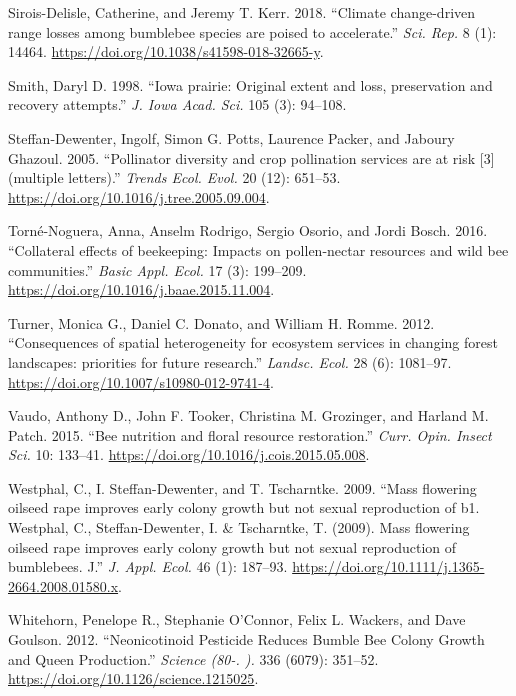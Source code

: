 \documentclass[11pt,]{article}
\begin{document}
\leavevmode\hypertarget{ref-Sirois-Delisle2018}{}%
Sirois-Delisle, Catherine, and Jeremy T. Kerr. 2018. ``Climate
change-driven range losses among bumblebee species are poised to
accelerate.'' \emph{Sci. Rep.} 8 (1): 14464.
\url{https://doi.org/10.1038/s41598-018-32665-y}.

\leavevmode\hypertarget{ref-Smith1998}{}%
Smith, Daryl D. 1998. ``Iowa prairie: Original extent and loss,
preservation and recovery attempts.'' \emph{J. Iowa Acad. Sci.} 105 (3):
94--108.

\leavevmode\hypertarget{ref-Steffan-Dewenter2005c}{}%
Steffan-Dewenter, Ingolf, Simon G. Potts, Laurence Packer, and Jaboury
Ghazoul. 2005. ``Pollinator diversity and crop pollination services are
at risk {[}3{]} (multiple letters).'' \emph{Trends Ecol. Evol.} 20 (12):
651--53. \url{https://doi.org/10.1016/j.tree.2005.09.004}.

\leavevmode\hypertarget{ref-Torne-Noguera2016}{}%
Torné-Noguera, Anna, Anselm Rodrigo, Sergio Osorio, and Jordi Bosch.
2016. ``Collateral effects of beekeeping: Impacts on pollen-nectar
resources and wild bee communities.'' \emph{Basic Appl. Ecol.} 17 (3):
199--209. \url{https://doi.org/10.1016/j.baae.2015.11.004}.

\leavevmode\hypertarget{ref-Turner2012}{}%
Turner, Monica G., Daniel C. Donato, and William H. Romme. 2012.
``Consequences of spatial heterogeneity for ecosystem services in
changing forest landscapes: priorities for future research.''
\emph{Landsc. Ecol.} 28 (6): 1081--97.
\url{https://doi.org/10.1007/s10980-012-9741-4}.

\leavevmode\hypertarget{ref-Vaudo2015}{}%
Vaudo, Anthony D., John F. Tooker, Christina M. Grozinger, and Harland
M. Patch. 2015. ``Bee nutrition and floral resource restoration.''
\emph{Curr. Opin. Insect Sci.} 10: 133--41.
\url{https://doi.org/10.1016/j.cois.2015.05.008}.

\leavevmode\hypertarget{ref-Westphal2009a}{}%
Westphal, C., I. Steffan-Dewenter, and T. Tscharntke. 2009. ``Mass
flowering oilseed rape improves early colony growth but not sexual
reproduction of b1. Westphal, C., Steffan-Dewenter, I. \& Tscharntke, T.
(2009). Mass flowering oilseed rape improves early colony growth but not
sexual reproduction of bumblebees. J.'' \emph{J. Appl. Ecol.} 46 (1):
187--93. \url{https://doi.org/10.1111/j.1365-2664.2008.01580.x}.

\leavevmode\hypertarget{ref-Whitehorn2012}{}%
Whitehorn, Penelope R., Stephanie O'Connor, Felix L. Wackers, and Dave
Goulson. 2012. ``Neonicotinoid Pesticide Reduces Bumble Bee Colony
Growth and Queen Production.'' \emph{Science (80-. ).} 336 (6079):
351--52. \url{https://doi.org/10.1126/science.1215025}.
\end{document}
